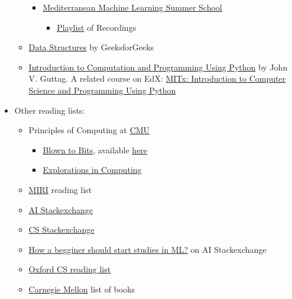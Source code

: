 \documentclass{article}
\begin{document}
\begin{itemize}
\begin{itemize}
\begin{itemize}
        \item \href{https://www.m2lschool.org/}{Mediterranean Machine Learning Summer School}
        \begin{itemize}
            \item \href{https://www.youtube.com/@m2lschool/playlists}{Playlist} of Recordings
        \end{itemize}
    \end{itemize}

    \item \href{https://www.geeksforgeeks.org/data-structures/}{Data Structures} by GeeksforGeeks

    \item \href{https://www.goodreads.com/book/show/16285317-introduction-to-computation-and-programming-using-python}{Introduction to Computation and Programming Using Python} by John V. Guttag. A related course on EdX: \href{https://www.edx.org/learn/computer-science/massachusetts-institute-of-technology-introduction-to-computer-science-and-programming-using-python}{MITx: Introduction to Computer Science and Programming Using Python}
    \end{itemize}

    
    
    \item Other reading lists:
    \begin{itemize}
        \item Principles of Computing at \href{https://www.cs.cmu.edu/~15110-s13/}{CMU}
        \begin{itemize}
            \item \href{https://www.goodreads.com/book/show/3063035-blown-to-bits}{Blown to Bits}, available \href{https://www.bitsbook.com/excerpts/}{here}
            \item \href{https://www.goodreads.com/book/show/18173802-explorations-in-computing}{Explorations in Computing}
        \end{itemize}
        \item \href{https://intelligence.org/research-guide/}{MIRI} reading list
        \item \href{https://web.archive.org/web/20211129111259/https://ai.stackexchange.com/questions/3374/how-does-one-start-learning-artificial-intelligence}{AI Stackexchange}
        \item \href{https://cs.stackexchange.com/questions/59319/best-starter-resources-for-learning-about-ai}{CS Stackexchange}
        \item \href{https://ai.stackexchange.com/questions/40136/how-a-begginer-should-start-studies-in-ml}{How a begginer should start studies in ML?} on AI Stackexchange
        \item \href{https://www.cs.ox.ac.uk/admissions/undergraduate/why_oxford/background_reading.html}{Oxford CS reading list}
        \item \href{http://www.cs.cmu.edu/~./books/}{Carnegie Mellon} list of books
    \end{itemize}
    

\end{itemize}
\end{document}
